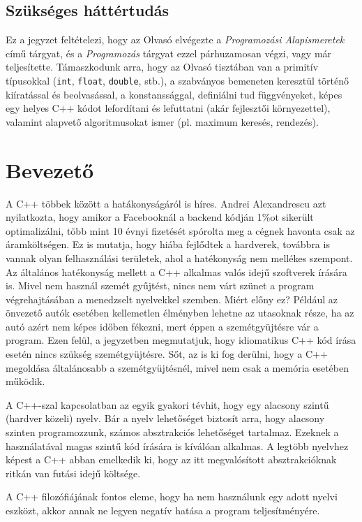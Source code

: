 \documentclass[../cpp_book/cpp_book.tex]{subfiles}
\begin{document}
	\subsection{Szükséges háttértudás}
	Ez a jegyzet feltételezi, hogy az Olvasó elvégezte a \emph{Programozási Alapismeretek} című tárgyat, és a \emph{Programozás} tárgyat ezzel párhuzamosan végzi, vagy már teljesítette. Támaszkodunk arra, hogy az Olvasó tisztában van a primitív típusokkal (\texttt{int}, \texttt{float}, \texttt{double}, stb.), a szabványos bemeneten keresztül történő kiíratással és beolvasással, a konstanssággal, definiálni tud függvényeket, képes egy helyes C++ kódot lefordítani és lefuttatni (akár fejlesztői környezettel), valamint alapvető algoritmusokat ismer (pl. maximum keresés, rendezés).

	\section{Bevezető}
	A C++ többek között a hatákonyságáról is híres. Andrei Alexandrescu azt nyilatkozta, hogy amikor a Facebooknál a backend kódján 1\%ot sikerült optimalizálni, több mint 10 évnyi fizetését spórolta meg a cégnek havonta csak az áramköltségen. Ez is mutatja, hogy hiába fejlődtek a hardverek, továbbra is vannak olyan felhasználási területek, ahol a hatékonyság nem mellékes szempont. Az általános hatékonyság mellett a C++ alkalmas valós idejű szoftverek írására is. Mivel nem használ szemét gyűjtést, nincs nem várt szünet a program végrehajtásában a menedzselt nyelvekkel szemben. Miért előny ez? Például az önvezető autók esetében kellemetlen élményben lehetne az utasoknak része, ha az autó azért nem képes időben fékezni, mert éppen a szemétgyüjtésre vár a program. Ezen felül, a jegyzetben megmutatjuk, hogy idiomatikus C++ kód írása esetén nincs szükség szemétgyüjtésre. Sőt, az is ki fog derülni, hogy a C++ megoldása általánosabb a szemétgyüjtésnél, mivel nem csak a memória esetében működik.

	A C++-szal kapcsolatban az egyik gyakori tévhit, hogy egy alacsony szintű (hardver közeli) nyelv. Bár a nyelv lehetőséget biztosít arra, hogy alacsony szinten programozzunk, számos absztrakciós lehetőséget tartalmaz. Ezeknek a használatával magas szintű kód írására is kíválóan alkalmas. A legtöbb nyelvhez képest a C++ abban emelkedik ki, hogy az itt megvalósított absztrakcióknak ritkán van futási idejű költsége.
	
	A C++ filozófiájának fontos eleme, hogy ha nem használunk egy adott nyelvi eszközt, akkor annak ne legyen negatív hatása a program teljesítményére.
	
\end{document}
